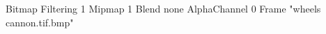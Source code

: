 {Bitmap
	{Filtering 1}
	{Mipmap 1}
	{Blend none}
	{AlphaChannel 0}
	{Frame "wheels cannon.tif.bmp"}
}
